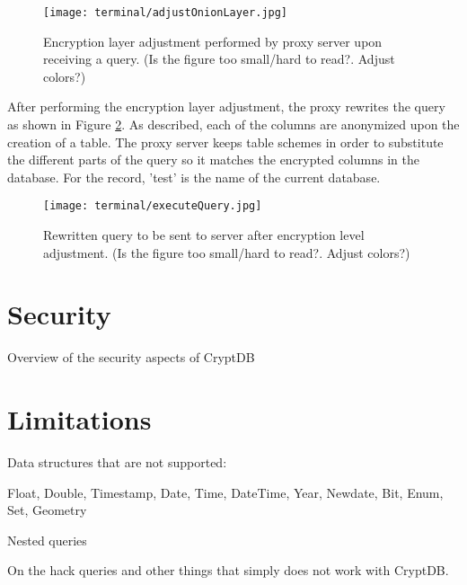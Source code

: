 \begin{figure}[h]
	\texttt{[image: terminal/adjustOnionLayer.jpg]}
	\caption{Encryption layer adjustment performed by proxy server upon receiving a query. (Is the figure too small/hard to read?. Adjust colors?)}
	\label{ope_layer_adjustment}
\end{figure}

\newpage
After performing the encryption layer adjustment, the proxy rewrites the query as shown in Figure \ref{rewritten_query}. As described, each of the columns are anonymized upon the creation of a table. The proxy server keeps table schemes in order to substitute the different parts of the query so it matches the encrypted columns in the database. For the record, 'test' is the name of the current database.  

\begin{figure}[h]
	\texttt{[image: terminal/executeQuery.jpg]}
	\caption{Rewritten query to be sent to server after encryption level adjustment. (Is the figure too small/hard to read?. Adjust colors?)}
	\label{rewritten_query}
\end{figure}


\section{Security}

Overview of the security aspects of CryptDB

\section{Limitations}

Data structures that are not supported:

Float, Double, Timestamp, Date, Time, DateTime, Year, Newdate, Bit, Enum, Set, Geometry

Nested queries

On the hack queries and other things that simply does not work with CryptDB. 